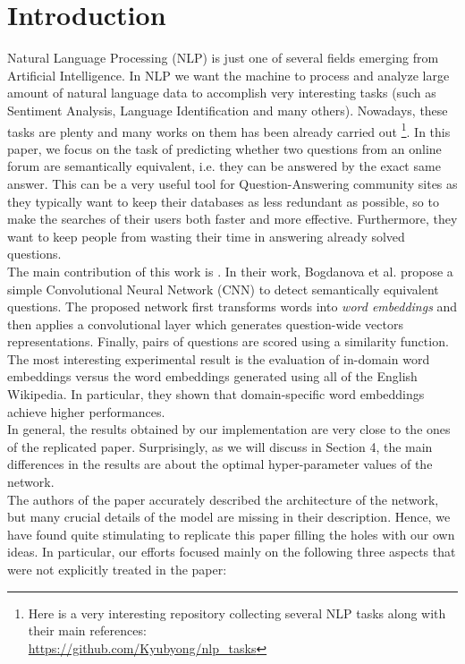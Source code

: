 \documentclass[10pt,twocolumn,letterpaper]{article}
\begin{document}
\section{Introduction}
Natural Language Processing (NLP) is just one of several fields emerging from Artificial Intelligence. In NLP we want the machine to process and analyze large amount of natural language data to accomplish very interesting tasks (such as Sentiment Analysis, Language Identification and many others). Nowadays, these tasks are plenty and many works on them has been already carried out \footnote{Here is a very interesting repository collecting several NLP tasks along with their main references: \\ \url{https://github.com/Kyubyong/nlp_tasks}}. In this paper, we focus on the task of predicting whether two questions from an online forum are semantically equivalent, i.e. they can be answered by the exact same answer. This can be a very useful tool for Question-Answering community sites as they typically want to keep their databases as less redundant as possible, so to make the searches of their users both faster and more effective. Furthermore, they want to keep people from wasting their time in answering already solved questions. \\
The main contribution of this work is \cite{bogdanova2015detecting}. In their work, Bogdanova et al. propose a simple Convolutional Neural Network (CNN) to detect semantically equivalent questions. The proposed network first transforms words into \emph{word embeddings} and then applies a convolutional layer which generates question-wide vectors representations. Finally, pairs of questions are scored using a similarity function. The most interesting experimental result is the evaluation of in-domain word embeddings versus the word embeddings generated using all of the English Wikipedia. In particular, they shown that domain-specific word embeddings achieve higher performances. \\
In general, the results obtained by our implementation are very close to the ones of the replicated paper. Surprisingly, as we will discuss in Section 4, the main differences in the results are about the optimal hyper-parameter values of the network.\\
The authors of the paper accurately described the architecture of the network, but many crucial details of the model are missing in their description. Hence, we have found quite stimulating to replicate this paper filling the holes with our own ideas. In particular, our efforts focused mainly on the following three aspects that were not explicitly treated in the paper: 
\end{document}
